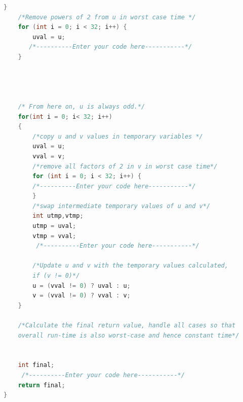 \documentclass{article}
\begin{document}
\begin{questions}
\begin{enumerate}
\begin{lstlisting}[language=C]
	}
    /*Remove powers of 2 from u in worst case time */
	for (int i = 0; i < 32; i++) {
		uval = u;
	   /*----------Enter your code here-----------*/
	}



	
    /* From here on, u is always odd.*/
	for(int i = 0; i< 32; i++)
	{
		/*copy u and v values in temporary variables */
		uval = u;
		vval = v;
		/*remove all factors of 2 in v in worst case time*/
		for (int i = 0; i < 32; i++) {
	    /*----------Enter your code here-----------*/
		}
		/*swap intermediate temporary values of u and v*/
		int utmp,vtmp;
		utmp = uval;
		vtmp = vval;
		 /*----------Enter your code here-----------*/

		/*Update u and v with the temporary values calculated, 
        if (v != 0)*/
		u = (vval != 0) ? uval : u;
		v = (vval != 0) ? vval : v;
	}

	/*Calculate the final return value, handle all cases so that 
    overall run-time is also worst-case and hence constant time*/
    
	
	int final;
	 /*----------Enter your code here-----------*/
	return final;
}
\end{lstlisting}

 



\end{enumerate}
\end{questions}
\end{document}
